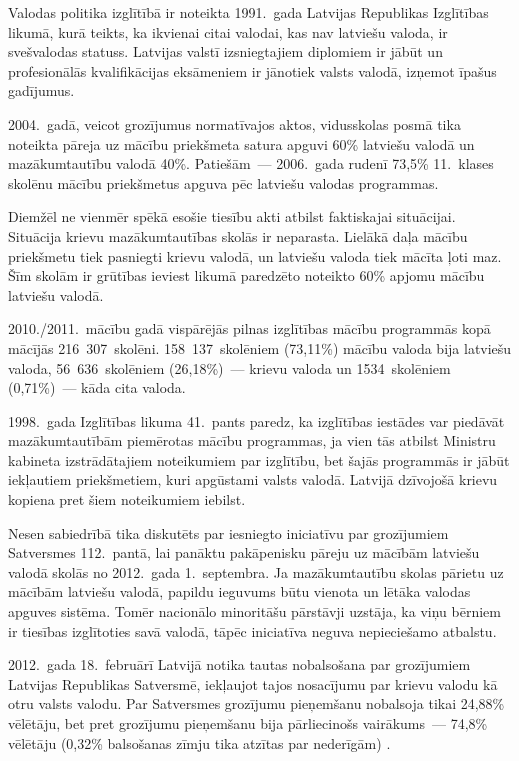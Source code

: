 \begin{multicols}{2}
Valodas politika izglītībā ir noteikta 1991.~gada Latvijas Republikas Izglītības likumā, kurā teikts, ka ikvienai citai valodai, kas nav latviešu valoda, ir svešvalodas statuss.
Latvijas valstī izsniegtajiem diplomiem ir jābūt un profesionālās kvalifikācijas eksāmeniem ir jānotiek valsts valodā, izņemot īpašus gadījumus. 


2004.~gadā, veicot grozījumus normatīvajos aktos, vidusskolas posmā tika noteikta pāreja uz mācību priekšmeta satura apguvi 60\% latviešu valodā un mazākumtautību valodā 40\%. 
Patiešām~--- 2006.~gada rudenī 73,5\% 11.~klases skolēnu mācību priekšmetus apguva pēc latviešu valodas programmas.

Diemžēl ne vienmēr spēkā esošie tiesību akti atbilst faktiskajai situācijai.
Situācija krievu mazākumtautības skolās ir neparasta.
Lielākā daļa mācību priekšmetu tiek pasniegti krievu valodā, un latviešu valoda tiek mācīta ļoti maz.
Šīm skolām ir grūtības ieviest likumā paredzēto noteikto 60\% apjomu mācību latviešu valodā.

2010./2011.~mācību gadā vispārējās pilnas izglītības mācību programmās kopā mācījās 216~307~skolēni.
158~137~skolēniem (73,11\%) mācību valoda bija latviešu valoda, 56~636~skolēniem (26,18\%)~--- krievu valoda un 1534~skolēniem (0,71\%)~--- kāda cita valoda.

1998.~gada Izglītības likuma 41.~pants paredz, ka izglītības iestādes var piedāvāt mazākumtautībām piemērotas mācību programmas, ja vien tās atbilst Ministru kabineta izstrādātajiem noteikumiem par izglītību, bet šajās programmās ir jābūt iekļautiem priekšmetiem, kuri apgūstami valsts valodā.
Latvijā dzīvojošā krievu kopiena pret šiem noteikumiem iebilst.

Nesen sabiedrībā tika diskutēts par iesniegto iniciatīvu par grozījumiem Satversmes 112.~pantā, lai panāktu pakāpenisku pāreju uz mācībām latviešu valodā skolās no 2012.~gada 1.~septembra. 
Ja mazākumtautību skolas pārietu uz mācībām latviešu valodā, papildu ieguvums būtu vienota un lētāka valodas apguves sistēma. 
Tomēr nacionālo minoritāšu pārstāvji uzstāja, ka viņu bērniem ir tiesības izglītoties savā valodā, tāpēc iniciatīva neguva nepieciešamo atbalstu.

2012.~gada 18.~februārī Latvijā notika tautas nobalsošana par grozījumiem Latvijas Republikas Satversmē, iekļaujot tajos nosacījumu par krievu valodu kā otru valsts valodu. 
Par Satversmes grozījumu pieņemšanu nobalsoja tikai 24,88\% vēlētāju, bet pret grozījumu pieņemšanu bija pārliecinošs vairākums~--- 74,8\% vēlētāju (0,32\% balsošanas zīmju tika atzītas par nederīgām) \cite{Meta55}.


\end{multicols}
